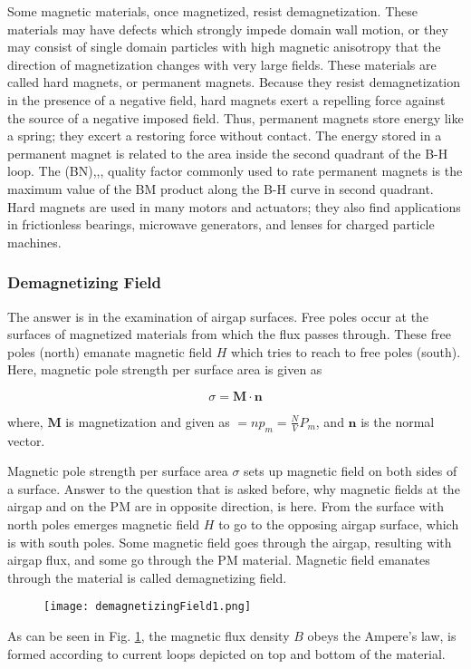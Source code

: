 Some magnetic materials, once magnetized, resist demagnetization. These materials may have defects which strongly impede domain wall motion, or they may consist of single domain particles with high magnetic anisotropy that the direction of magnetization changes with very large fields. These materials are called hard magnets, or permanent magnets. Because they  resist demagnetization in the  presence 
of a  negative field, hard magnets exert a  repelling  force  against  the  source 
of a  negative  imposed field. Thus, permanent  magnets store energy  like a spring;  they excert a  restoring force without contact. The energy stored in a permanent magnet is related to the area inside the  second quadrant of the B-H loop. The (BN),,, quality factor commonly used to rate permanent magnets is the maximum value 
of the BM product  along the B-H   curve in  second quadrant. Hard magnets are used  in many motors and actuators; they also find applications in  frictionless bearings,  microwave  generators, and lenses for charged particle machines.

\subsubsection{Demagnetizing Field}
\label{sec:demagnetizingField}

The answer is in the examination of airgap surfaces. Free poles occur at the surfaces of magnetized materials from which the flux passes through. These free poles (north) emanate magnetic field $H$ which tries to reach to free poles (south). Here, magnetic pole strength per surface area is given as

\begin{equation}
	\sigma = \textbf{M} \cdot \textbf{n}
\end{equation}

where, $\textbf{M}$ is magnetization and given as $= np_{m} = \frac{N}{V} P_{m}$, and $\textbf{n}$ is the normal vector.

Magnetic pole strength per surface area $\sigma$ sets up magnetic field on both sides of a surface. Answer to the question that is asked before, why magnetic fields at the airgap and on the PM are in opposite direction, is here. From the surface with north poles emerges magnetic field $H$ to go to the opposing airgap surface, which is with south poles. Some magnetic field goes through the airgap, resulting with airgap flux, and some go through the PM material. Magnetic field emanates through the material is called demagnetizing field.

\begin{figure}[h]
    \centering
    \texttt{[image: demagnetizingField1.png]}
    \label{fig:demagnetizingField1}
\end{figure}

As can be seen in Fig. \ref{fig:demagnetizingField1}, the magnetic flux density $B$ obeys the Ampere's law, is formed according to current loops depicted on top and bottom of the material.

